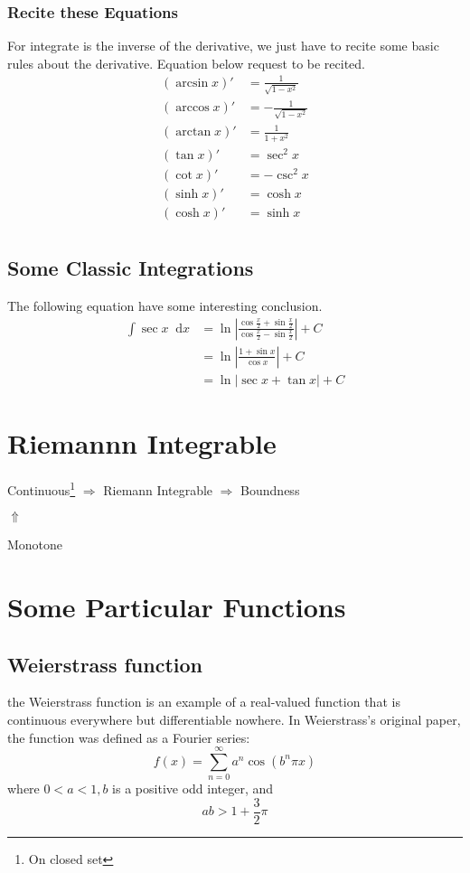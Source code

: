 \documentclass[11pt]{article}
\newcommand*\diff{\mathop{}\!\mathrm{d}}
\begin{document}
\subsubsection{Recite these Equations}
For integrate is the inverse of the derivative, we just have to recite some basic rules about the derivative.
Equation below request to be recited.
\begin{equation}
\begin{aligned}
(\arcsin x)'&=\frac{1}{\sqrt{1-x^2}}\\
(\arccos x)'&=-\frac{1}{\sqrt{1-x^2}}\\
(\arctan x)'&=\frac{1}{1+x^2}\\
(\tan x)'&=\sec^2 x\\
(\cot x)'&=-\csc^2 x\\
(\sinh x)'&= \cosh x\\ 
(\cosh x)'&= \sinh x\\
\end{aligned}
\end{equation}

\subsection{Some Classic Integrations}
The following equation have some interesting conclusion.
\begin{equation}
\begin{aligned}
\int \sec x\diff x &=\ln  \left|\frac{\cos \frac{x}{2} + \sin \frac{x}{2}}{\cos \frac{x}{2} -\sin \frac{x}{2}}\right|+C\\
&= \ln \left| \frac{1+\sin x}{\cos x}\right|+C \\
&= \ln \left| \sec x+ \tan x \right| + C
\end{aligned}
\end{equation}

\section{Riemannn Integrable}
Continuous\footnote{On closed set} $\Rightarrow$ Riemann Integrable $\Rightarrow$ Boundness

\quad \quad \qquad \qquad \qquad \quad $\Uparrow$

\quad \qquad \qquad \qquad Monotone 


\section{Some Particular Functions}
\subsection{Weierstrass function}
the Weierstrass function is an example of a real-valued function that is continuous everywhere but differentiable nowhere.
In Weierstrass's original paper, the function was defined as a Fourier series:
$$
f(x)=\sum_{n=0}^{\infty} a^{n} \cos \left(b^{n} \pi x\right)
$$
where $0<a<1, b$ is a positive odd integer, and
$$
a b>1+\frac{3}{2} \pi
$$
\end{document}
